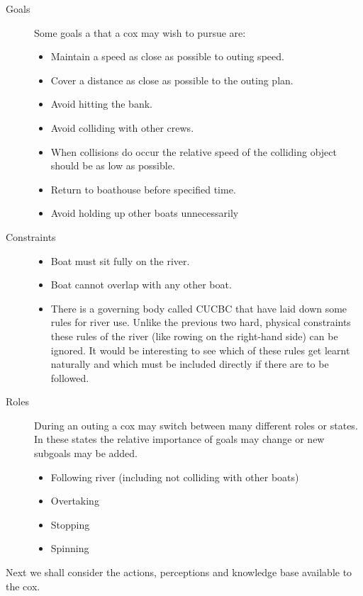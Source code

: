 \begin{description}
  \item[Goals]
    Some goals a that a cox may wish to pursue are:
    \begin{itemize}
      \item Maintain a speed as close as possible to outing speed.
      \item Cover a distance as close as possible to the outing plan.
      \item Avoid hitting the bank.
      \item Avoid colliding with other crews.
      \item When collisions do occur the relative speed of the colliding object should be as low as possible.
      \item Return to boathouse before specified time.
      \item Avoid holding up other boats unnecessarily
    \end{itemize}
    
  \item[Constraints]
    \begin{itemize}
      \item Boat must sit fully on the river.
      \item Boat cannot overlap with any other boat.
      \item There is a governing body called CUCBC that have laid down some rules for river use. Unlike the previous two hard, physical constraints these rules of the river (like rowing on the right-hand side) can be ignored. It would be interesting to see which of these rules get learnt naturally and which must be included directly if there are to be followed.
    \end{itemize}
    
  \item[Roles]
    During an outing a cox may switch between many different roles or states. In these states the relative importance of goals may change or new subgoals may be added.
    \begin{itemize}
      \item Following river (including not colliding with other boats)
      \item Overtaking
      \item Stopping
      \item Spinning
    \end{itemize}
  \end{description}
  
  Next we shall consider the actions, perceptions and knowledge base available to the cox.
  
